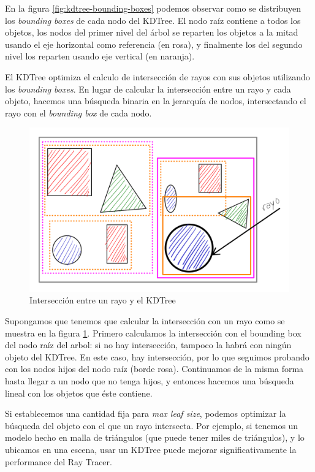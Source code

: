 En la figura \ref{fig:kdtree-bounding-boxes} podemos observar como se
distribuyen los \textit{bounding boxes} de cada nodo del KDTree. El nodo raíz
contiene a todos los objetos, los nodos del primer nivel del árbol se
reparten los objetos a la mitad usando el eje horizontal como referencia (en
rosa), y finalmente los del segundo nivel los reparten usando eje vertical (en
naranja).

El KDTree optimiza el calculo de intersección de rayos con sus objetos
utilizando los \textit{bounding boxes}. En lugar de calcular la intersección
entre un rayo y cada objeto, hacemos una búsqueda binaria en la jerarquía de
nodos, intersectando el rayo con el \textit{bounding box} de cada nodo.

\begin{figure}
    \centering
    \includegraphics[width=\textwidth]{imgs/kdtree-ray-intersection.png}
    \caption{Intersección entre un rayo y el KDTree}
    \label{fig:kdtree-ray-intersection}
\end{figure}

Supongamos que tenemos que calcular la intersección con un rayo como se muestra
en la figura \ref{fig:kdtree-ray-intersection}. Primero calculamos la
intersección con el bounding box del nodo raíz del arbol: si no hay
intersección, tampoco la habrá con ningún objeto del KDTree. En este caso, hay
intersección, por lo que seguimos probando con los nodos hijos del nodo raíz
(borde rosa). Continuamos de la misma forma hasta llegar a un nodo que no tenga
hijos, y entonces hacemos una búsqueda lineal con los objetos que éste contiene.

Si establecemos una cantidad fija para \textit{max leaf size}, podemos optimizar
la búsqueda del objeto con el que un rayo intersecta. Por ejemplo, si tenemos un
modelo hecho en malla de triángulos (que puede tener miles de triángulos), y lo
ubicamos en una escena, usar un KDTree puede mejorar significativamente la
performance del Ray Tracer.

